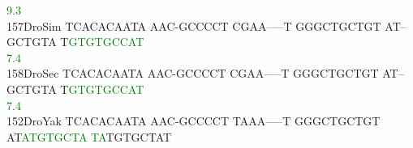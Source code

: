 \documentclass[11pt,twoside,reqno,a4paper]{article}
\begin{document}
{\hspace*{4\charwidth}\hspace*{7\charwidth}\hspace*{1\charwidth}\hspace*{1\charwidth}\hspace*{1\charwidth}\hspace*{1\charwidth}\hspace*{44\charwidth}\textcolor{Green}{9.3}\hspace*{1\charwidth}\hspace*{1\charwidth}\\
157\hspace*{1\charwidth}DroSim	TCACACAATA	AAC-GCCCCT	CGAA-----T	GGGCTGCTGT	AT--GCTGTA	T\textcolor{Green}{G}\textcolor{Green}{T}\textcolor{Green}{G}\textcolor{Green}{T}\textcolor{Green}{G}\textcolor{Green}{C}\textcolor{Green}{C}\textcolor{Green}{A}\textcolor{Green}{T}	\\
\hspace*{4\charwidth}\hspace*{7\charwidth}\hspace*{1\charwidth}\hspace*{1\charwidth}\hspace*{1\charwidth}\hspace*{1\charwidth}\hspace*{1\charwidth}\hspace*{51\charwidth}\textcolor{Green}{7.4}\hspace*{1\charwidth}\\
158\hspace*{1\charwidth}DroSec	TCACACAATA	AAC-GCCCCT	CGAA-----T	GGGCTGCTGT	AT--GCTGTA	T\textcolor{Green}{G}\textcolor{Green}{T}\textcolor{Green}{G}\textcolor{Green}{T}\textcolor{Green}{G}\textcolor{Green}{C}\textcolor{Green}{C}\textcolor{Green}{A}\textcolor{Green}{T}	\\
\hspace*{4\charwidth}\hspace*{7\charwidth}\hspace*{1\charwidth}\hspace*{1\charwidth}\hspace*{1\charwidth}\hspace*{1\charwidth}\hspace*{1\charwidth}\hspace*{51\charwidth}\textcolor{Green}{7.4}\hspace*{1\charwidth}\\
152\hspace*{1\charwidth}DroYak	TCACACAATA	AAC-GCCCCT	TAAA-----T	GGGCTGCTGT	AT\textcolor{Green}{A}\textcolor{Green}{T}\textcolor{Green}{G}\textcolor{Green}{T}\textcolor{Green}{G}\textcolor{Green}{C}\textcolor{Green}{T}\textcolor{Green}{A}	\textcolor{Green}{T}\textcolor{Green}{A}TGTGCTAT	\\
}
\end{document}
